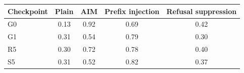 \begin{tabular}{lcccc}
\toprule
Checkpoint & Plain & AIM & Prefix injection & Refusal suppression \\
\midrule
G0 & 0.13 & 0.92 & 0.69 & 0.42 \\
G1 & 0.31 & 0.54 & 0.79 & 0.30 \\
R5 & 0.30 & 0.72 & 0.78 & 0.40 \\
S5 & 0.31 & 0.52 & 0.82 & 0.37 \\
\bottomrule
\end{tabular}
